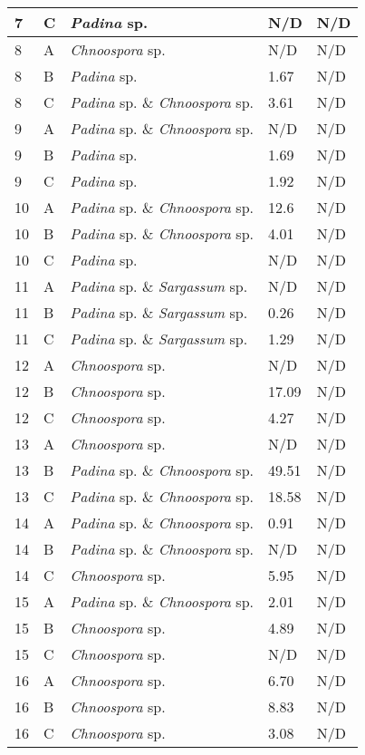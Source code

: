 \documentclass[12pt]{article}
\begin{document}
\begin{longtable}{ | p{2cm} | p{2cm} | p{3cm} | p{3.5cm} | p{3.5cm} | }
\hline
7
&C&\emph{Padina} sp.&N/D&N/D\\
\hline
8&A&\emph{Chnoospora} sp.&N/D&N/D\\
\hline
8&B&\emph{Padina} sp.&1.67
&N/D\\
\hline
8&C&\emph{Padina} sp. \& \emph{Chnoospora} sp.&3.61
&N/D\\
\hline
9&A&\emph{Padina} sp. \& \emph{Chnoospora} sp.&N/D&N/D\\
\hline
9&B&\emph{Padina} sp.&1.69
&N/D\\
\hline
9&C&\emph{Padina} sp.&1.92
&N/D\\
\hline
10&A&\emph{Padina} sp. \& \emph{Chnoospora} sp.&12.6
&N/D\\
\hline
10&B&\emph{Padina} sp. \& \emph{Chnoospora} sp.&4.01
&N/D\\
\hline
10&C&\emph{Padina} sp.&N/D&N/D\\
\hline
11 
&A&
\emph{Padina} sp. \& \emph{Sargassum} sp.&N/D&N/D\\
\hline
11 
&B&\emph{Padina} sp. \& \emph{Sargassum} sp.&0.26&N/D\\
\hline
11 
&C&\emph{Padina} sp. \& \emph{Sargassum} sp.&1.29&N/D\\
\hline
12&A&\emph{Chnoospora} sp.&N/D&N/D\\
\hline
12&B&\emph{Chnoospora} sp.&17.09
&N/D\\
\hline
12&C&\emph{Chnoospora} sp.&4.27
&N/D\\
\hline
13&A&\emph{Chnoospora} sp.&N/D&N/D\\
\hline
13&B&\emph{Padina} sp. \& \emph{Chnoospora} sp.&49.51
&N/D\\
\hline
13&C&\emph{Padina} sp. \& \emph{Chnoospora} sp.&18.58
&N/D\\
\hline
14&A&\emph{Padina} sp. \& \emph{Chnoospora} sp.&0.91
&N/D\\
\hline
14&B&\emph{Padina} sp. \& \emph{Chnoospora} sp.&N/D&N/D\\
\hline
14&C&\emph{Chnoospora} sp.&5.95
&N/D\\
\hline
15&A&\emph{Padina} sp. \& \emph{Chnoospora} sp.&2.01
&N/D\\
\hline
15&B&\emph{Chnoospora} sp.&4.89
&N/D\\
\hline
15&C&\emph{Chnoospora} sp.&N/D&N/D\\
\hline
16&A&\emph{Chnoospora} sp.&6.70&N/D\\
\hline
16&B&\emph{Chnoospora} sp.&8.83
&N/D\\
\hline
16&C&\emph{Chnoospora} sp.&3.08
&N/D\\

\end{longtable}
\end{document}
